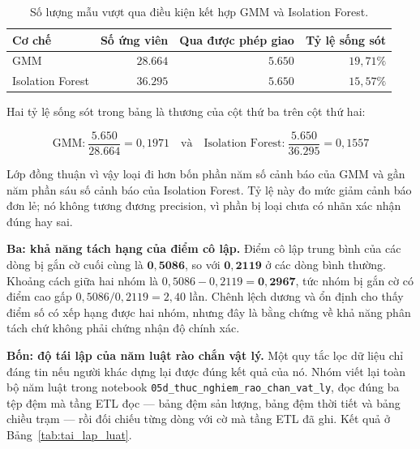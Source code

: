\documentclass[12pt, a4paper]{report}
\begin{document}
\begin{table}[htbp]
\centering
\caption{Số lượng mẫu vượt qua điều kiện kết hợp GMM và Isolation Forest.}
\label{tab:song_sot_and}
\small
\begin{tabular}{l r r r}
\toprule
\textbf{Cơ chế} & \textbf{Số ứng viên} & \textbf{Qua được phép giao} & \textbf{Tỷ lệ sống sót} \\
\midrule
GMM              & $28.664$ & $5.650$ & $19{,}71\%$ \\
Isolation Forest & $36.295$ & $5.650$ & $15{,}57\%$ \\
\bottomrule
\end{tabular}
\end{table}

Hai tỷ lệ sống sót trong bảng là thương của cột thứ ba trên cột thứ hai:

\begin{equation}
\text{GMM:}\ \frac{5.650}{28.664} = 0{,}1971 \quad\text{và}\quad
\text{Isolation Forest:}\ \frac{5.650}{36.295} = 0{,}1557
\end{equation}

Lớp đồng thuận vì vậy loại đi hơn bốn phần năm số cảnh báo của GMM và gần năm phần sáu số
cảnh báo của Isolation Forest. Tỷ lệ này đo mức giảm cảnh báo đơn lẻ; nó không tương
đương precision, vì phần bị loại chưa có nhãn xác nhận đúng hay sai.

\textbf{Ba: khả năng tách hạng của điểm cô lập.} Điểm cô lập trung bình của các dòng bị
gắn cờ cuối cùng là $\mathbf{0{,}5086}$, so với $\mathbf{0{,}2119}$ ở các dòng bình thường.
Khoảng cách giữa hai nhóm là $0{,}5086 - 0{,}2119 = \mathbf{0{,}2967}$, tức nhóm bị gắn cờ có
điểm cao gấp $0{,}5086 / 0{,}2119 = 2{,}40$ lần. Chênh lệch dương và ổn định cho thấy điểm số
có xếp hạng được hai nhóm, nhưng đây là bằng chứng về khả năng phân tách chứ không phải chứng
nhận độ chính xác.

\textbf{Bốn: độ tái lập của năm luật rào chắn vật lý.} Một quy tắc lọc dữ liệu chỉ đáng
tin nếu người khác dựng lại được đúng kết quả của nó. Nhóm viết lại toàn bộ năm luật trong
notebook \texttt{05d\_thuc\_nghiem\_rao\_chan\_vat\_ly}, đọc đúng ba tệp đệm mà tầng ETL đọc --- bảng
đệm sản lượng, bảng đệm thời tiết và bảng chiều trạm --- rồi đối chiếu từng dòng với cờ mà
tầng ETL đã ghi. Kết quả ở Bảng~\ref{tab:tai_lap_luat}.
\end{document}
